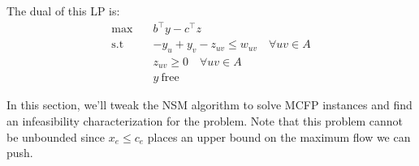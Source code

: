 The dual of this LP is:
\begin{equation}\label{eq:mcfp_dual-formulation}
\begin{aligned}
    \max \quad &b^\intercal y - c^\intercal z \\
    \text{s.t} \quad &-y_u + y_v - z_{uv} \leq w_{uv} \quad \forall uv \in A \\
    &z_{uv} \geq 0 \quad \forall uv \in A \\
    &y\:\text{free}
\end{aligned}
\end{equation}

In this section, we'll tweak the NSM algorithm to solve MCFP instances and find an infeasibility characterization for the problem.
Note that this problem cannot be unbounded since $x_e \leq c_e$ places an upper bound on the maximum flow we can push.
